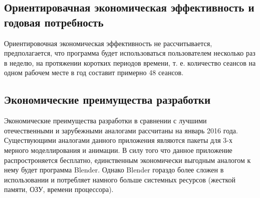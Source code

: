 \subsection{Ориентировачная экономическая эффективность и годовая потребность}
Ориентировочная экономическая эффективность не рассчитывается, предполагается, что программа будет использоваться пользователем несколько раз в неделю, на протяжении коротких периодов времени, т. е. количество сеансов на одном рабочем месте в год составит примерно 48 сеансов.

\subsection{Экономические преимущества разработки}
Экономические преимущества разработки в сравнении с лучшими отечественными и зарубежными аналогами рассчитаны на январь 2016 года. Существующими аналогами данного приложения являются пакеты для 3-х мерного моделлирования и анимации. В силу того что данное приложение распростроняется бесплатно, единственным экономически выгодным аналогом к нему будет программа Blender. Однако Blender гораздо более сложен в использовании и потребляет намного больше системных ресурсов (жесткой памяти, ОЗУ, времени процессора).